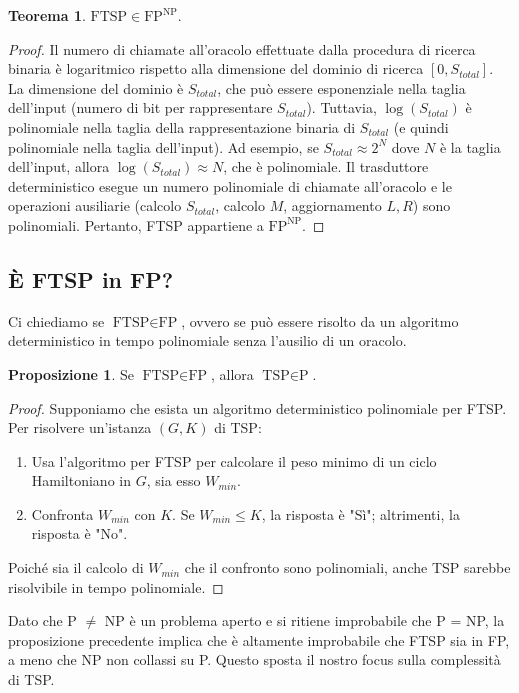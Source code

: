 \documentclass[a4paper]{article}
\theoremstyle{definition} %
\newtheorem{theorem}{Teorema}
\newtheorem{proposition}{Proposizione}
\begin{document}
\begin{theorem}
$\text{FTSP} \in \text{FP}^{\text{NP}}$.
\end{theorem}
\begin{proof}
Il numero di chiamate all'oracolo effettuate dalla procedura di ricerca binaria è logaritmico rispetto alla dimensione del dominio di ricerca $[0, S_{total}]$.
La dimensione del dominio è $S_{total}$, che può essere esponenziale nella taglia dell'input (numero di bit per rappresentare $S_{total}$).
Tuttavia, $\log(S_{total})$ è polinomiale nella taglia della rappresentazione binaria di $S_{total}$ (e quindi polinomiale nella taglia dell'input).
Ad esempio, se $S_{total} \approx 2^N$ dove $N$ è la taglia dell'input, allora $\log(S_{total}) \approx N$, che è polinomiale.
Il trasduttore deterministico esegue un numero polinomiale di chiamate all'oracolo e le operazioni ausiliarie (calcolo $S_{total}$, calcolo $M$, aggiornamento $L, R$) sono polinomiali. Pertanto, FTSP appartiene a $\text{FP}^{\text{NP}}$.
\end{proof}

\subsection{È FTSP in FP?}

Ci chiediamo se $\text{FTSP} \in \text{FP}$, ovvero se può essere risolto da un algoritmo deterministico in tempo polinomiale senza l'ausilio di un oracolo.

\begin{proposition}
Se $\text{FTSP} \in \text{FP}$, allora $\text{TSP} \in \text{P}$.
\end{proposition}
\begin{proof}
Supponiamo che esista un algoritmo deterministico polinomiale per FTSP. Per risolvere un'istanza $(G, K)$ di TSP:
\begin{enumerate}
    \item Usa l'algoritmo per FTSP per calcolare il peso minimo di un ciclo Hamiltoniano in $G$, sia esso $W_{min}$.
    \item Confronta $W_{min}$ con $K$. Se $W_{min} \le K$, la risposta è "Sì"; altrimenti, la risposta è "No".
\end{enumerate}
Poiché sia il calcolo di $W_{min}$ che il confronto sono polinomiali, anche TSP sarebbe risolvibile in tempo polinomiale.
\end{proof}

Dato che P $\neq$ NP è un problema aperto e si ritiene improbabile che P = NP, la proposizione precedente implica che è altamente improbabile che FTSP sia in FP, a meno che NP non collassi su P. Questo sposta il nostro focus sulla complessità di TSP.
\end{document}
